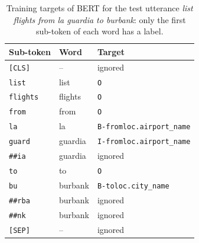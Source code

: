 \documentclass[a4paper]{article}
\begin{document}
\begin{table}[t]
  \caption{Test results on ATIS: mean $\pm$ sample standard deviation over 5 runs, each evaluated at its best dev
  epoch. $^{*}$: significantly better than the previous row (Welch's t-test, $p<0.05$).}
  \label{tab:results}
  \centering
  
\end{table}

\begin{table}[t]
  \caption{Training targets of BERT for the test utterance \emph{list flights from la guardia to burbank}: only the
  first sub-token of each word has a label.}
  \label{tab:align}
  \centering
  \small
  \begin{tabular}{l l l}
    \toprule
    Sub-token & Word & Target \\
    \midrule
    \texttt{[CLS]}    & --      & ignored \\
    \texttt{list}     & list    & \texttt{O} \\
    \texttt{flights}  & flights & \texttt{O} \\
    \texttt{from}     & from    & \texttt{O} \\
    \texttt{la}       & la      & \texttt{B-fromloc.airport\_name} \\
    \texttt{guard}    & guardia & \texttt{I-fromloc.airport\_name} \\
    \texttt{\#\#ia}   & guardia & ignored \\
    \texttt{to}       & to      & \texttt{O} \\
    \texttt{bu}       & burbank & \texttt{B-toloc.city\_name} \\
    \texttt{\#\#rba}  & burbank & ignored \\
    \texttt{\#\#nk}   & burbank & ignored \\
    \texttt{[SEP]}    & --      & ignored \\
    \bottomrule
  \end{tabular}
\end{table}



\end{document}
